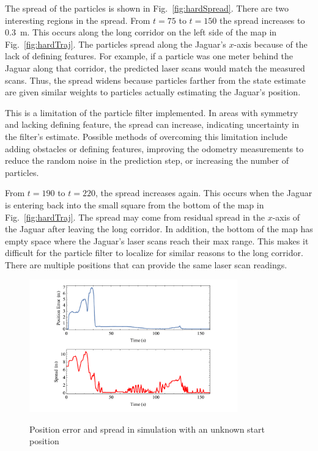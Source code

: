 \documentclass[conference]{../IEEEtran}
\begin{document}
The spread of the particles is shown in Fig.~\ref{fig:hardSpread}. There are two
interesting regions in the spread.  From $t=75$ to $t=150$ the spread increases to
\SI{0.3}{\meter}.  This occurs along the long corridor on the left side of the map in
Fig.~\ref{fig:hardTraj}.  The particles spread along the Jaguar's $x$-axis because of the
lack of defining features.  For example, if a particle was one meter behind the Jaguar
along that corridor, the predicted laser scans would match the measured scans.  Thus, the
spread widens because particles farther from the state estimate are given similar weights
to particles actually estimating the Jaguar's position.

This is a limitation of the particle filter implemented.  In areas with symmetry and
lacking defining feature, the spread can increase, indicating uncertainty in the filter's
estimate.  Possible methods of overcoming this limitation include adding obstacles or
defining features, improving the odometry measurements to reduce the random noise in the
prediction step, or increasing the number of particles.

From $t=190$ to $t=220$, the spread increases again.  This occurs when the Jaguar is
entering back into the small square from the bottom of the map in Fig.~\ref{fig:hardTraj}.
The spread may come from residual spread in the $x$-axis of the Jaguar after leaving the
long corridor.  In addition, the bottom of the map has empty space where the Jaguar's
laser scans reach their max range.  This makes it difficult for the particle filter to
localize for similar reasons to the long corridor.  There are multiple positions that can
provide the same laser scan readings.


\begin{figure}[t]
  \centering
  \includegraphics[width=9cm]{figures/sim_unknown_start_error.pdf}
  \label{fig:sim_unknown_err}
  \caption{Position error and spread in simulation with an unknown start position}
\end{figure}
\end{document}
